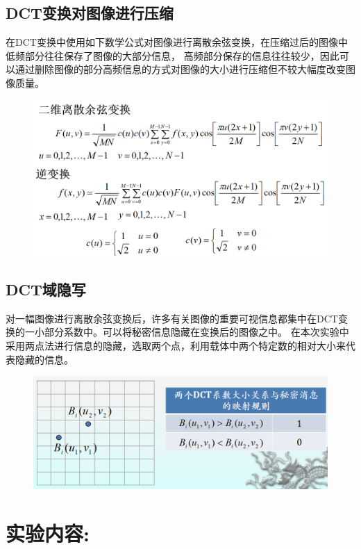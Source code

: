\documentclass[a4paper,11pt,UTF8]{ctexart}
\newcommand{\bottomcaption}{%
\setlength{\abovecaptionskip}{6pt}%
\setlength{\belowcaptionskip}{6pt}%
\caption}
\newcommand{\xiaowuhao}{\fontsize{9pt}{\baselineskip}\selectfont}   %
\begin{document}
  \subsection{DCT变换对图像进行压缩}
    在DCT变换中使用如下数学公式对图像进行离散余弦变换，在压缩过后的图像中低频部分往往保存了图像的大部分信息，
    高频部分保存的信息往往较少，因此可以通过删除图像的部分高频信息的方式对图像的大小进行压缩但不较大幅度改变图像质量。
    \begin{figure}[!htbp]
    \centering
    \includegraphics[width=\textwidth]{DCT_math.png}
    \bottomcaption{\xiaowuhao{DCT压缩原理}}
    \end{figure}

  \subsection{DCT域隐写}
  对一幅图像进行离散余弦变换后，许多有关图像的重要可视信息都集中在DCT变换的一小部分系数中。可以将秘密信息隐藏在变换后的图像之中。
  在本次实验中采用两点法进行信息的隐藏，选取两个点，利用载体中两个特定数的相对大小来代表隐藏的信息。
  \begin{figure}[!htbp]
  \centering
  \includegraphics[width=\textwidth]{DCT.png}
  \bottomcaption{\xiaowuhao{DCT隐写原理}}
  \end{figure}


\section{实验内容:}
\end{document}
